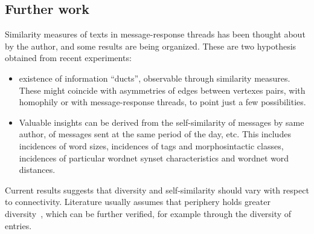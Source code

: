 \documentclass[%
 aip,
 jmp,%
 amsmath,amssymb,
 reprint,%
]{revtex4-1}
\begin{document}
\subsection{Further work}\label{subsec:fw}

Similarity measures of texts in message-response threads has been thought about by the author, and some results are being organized.
These are two hypothesis obtained from recent experiments:
\begin{itemize}
    \item existence of information ``ducts'', observable through similarity measures. These might coincide with asymmetries of edges between vertexes pairs, with homophily or with message-response threads, to point just a few possibilities.
    \item Valuable insights can be derived from the self-similarity of messages by same author,
	    of messages sent at the same period of the day, etc.
	    This includes incidences of word sizes, incidences of tags and morphosintactic classes,
	    incidences of particular wordnet synset characteristics and wordnet word distances.
\end{itemize}

Current results suggests that diversity and self-similarity should vary with respect to connectivity. 
Literature usually assumes that periphery holds greater diversity~\cite{easley},
which can be further verified, for example through the diversity of entries.
\end{document}

